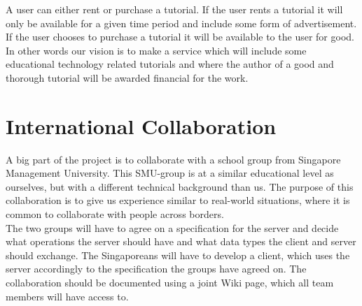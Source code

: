A user can either rent or purchase a tutorial. If the user rents a tutorial it will only be available for a given time period and include some form of advertisement. If the user chooses to purchase a tutorial it will be available to the user for good. \\ 
In other words our vision is to make a service which will include some educational technology related tutorials and  where the author of a good and thorough tutorial will be awarded financial for the work.

\section{International Collaboration}
A big part of the project is to collaborate with a school group from Singapore Management University. This SMU-group is at a similar educational level as ourselves, but with a different technical background than us. The purpose of this collaboration is to give us experience similar to real-world situations, where it is common to collaborate with people across borders.\\
The two groups will have to agree on a specification for the server and decide what operations the server should have and what data types the client and server should exchange.
The Singaporeans will have to develop a client, which uses the server accordingly to the specification the groups have agreed on. The collaboration should be documented using a joint Wiki page, which all team members will have access to. 

